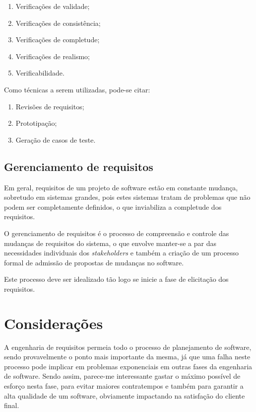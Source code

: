 \documentclass[article, a4paper, oneside, 11pt, english, brazil, sumario=tradicional]{abntex2}
\begin{document}
\begin{enumerate}
\item Verificações de validade;
\item Verificações de consistência;
\item Verificações de completude;
\item Verificações de realismo;
\item Verificabilidade.
\end{enumerate}

Como técnicas a serem utilizadas, pode-se citar:

\begin{enumerate}
\item Revisões de requisitos;
\item Prototipação;
\item Geração de casos de teste.
\end{enumerate}

\subsection{Gerenciamento de requisitos}
\label{sec:org9bb07ac}

Em  geral, requisitos  de um  projeto de  software estão  em constante
mudança, sobretudo em sistemas grandes,  pois estes sistemas tratam de
problemas que não podem ser completamente definidos, o que inviabiliza
a completude dos requisitos.

O gerenciamento de  requisitos é o processo de  compreensão e controle
das mudanças de  requisitos do sistema, o que envolve  manter-se a par
das necessidades individuais dos \emph{stakeholders}  e também a criação de
um processo formal de admissão de propostas de mudanças no software.

Este  processo deve  ser  idealizado  tão logo  se  inicie  a fase  de
elicitação dos requisitos.

\section{Considerações}
\label{sec:org82c8de5}

A engenharia de requisitos permeia  todo o processo de planejamento de
software, sendo provavelmente o ponto mais importante da mesma, já que
uma falha  neste processo pode  implicar em problemas  exponenciais em
outras  fases  da  engenharia  de  software.  Sendo  assim,  parece-me
interessante  gastar o  máximo possível  de esforço  nesta fase,  para
evitar maiores contratempos e também para garantir a alta qualidade de
um software, obviamente impactando na satisfação do cliente final.
\end{document}
